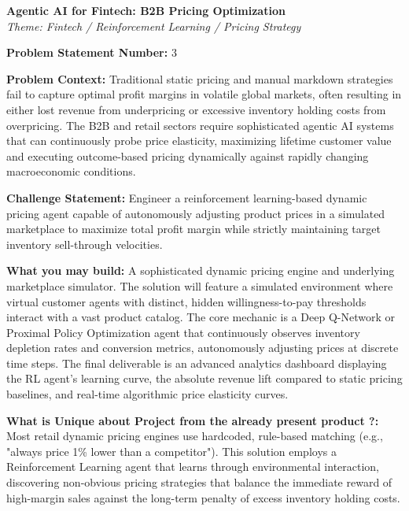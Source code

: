 \documentclass[11pt, a4paper]{article}
\begin{document}
\begin{center}
    \Large\textbf{Agentic AI for Fintech: B2B Pricing Optimization} \\
    \normalsize\textit{Theme: Fintech / Reinforcement Learning / Pricing Strategy}
\end{center}
\vspace{0.8cm}

\noindent\textbf{Problem Statement Number:} 3

\vspace{0.4cm}
\noindent\textbf{Problem Context:} Traditional static pricing and manual markdown strategies fail to capture optimal profit margins in volatile global markets, often resulting in either lost revenue from underpricing or excessive inventory holding costs from overpricing. The B2B and retail sectors require sophisticated agentic AI systems that can continuously probe price elasticity, maximizing lifetime customer value and executing outcome-based pricing dynamically against rapidly changing macroeconomic conditions.

\vspace{0.4cm}
\noindent\textbf{Challenge Statement:} Engineer a reinforcement learning-based dynamic pricing agent capable of autonomously adjusting product prices in a simulated marketplace to maximize total profit margin while strictly maintaining target inventory sell-through velocities.

\vspace{0.4cm}
\noindent\textbf{What you may build:} A sophisticated dynamic pricing engine and underlying marketplace simulator. The solution will feature a simulated environment where virtual customer agents with distinct, hidden willingness-to-pay thresholds interact with a vast product catalog. The core mechanic is a Deep Q-Network or Proximal Policy Optimization agent that continuously observes inventory depletion rates and conversion metrics, autonomously adjusting prices at discrete time steps. The final deliverable is an advanced analytics dashboard displaying the RL agent's learning curve, the absolute revenue lift compared to static pricing baselines, and real-time algorithmic price elasticity curves.

\vspace{0.4cm}
\noindent\textbf{What is Unique about Project from the already present product ?:} Most retail dynamic pricing engines use hardcoded, rule-based matching (e.g., "always price 1\% lower than a competitor"). This solution employs a Reinforcement Learning agent that learns through environmental interaction, discovering non-obvious pricing strategies that balance the immediate reward of high-margin sales against the long-term penalty of excess inventory holding costs.
\end{document}
